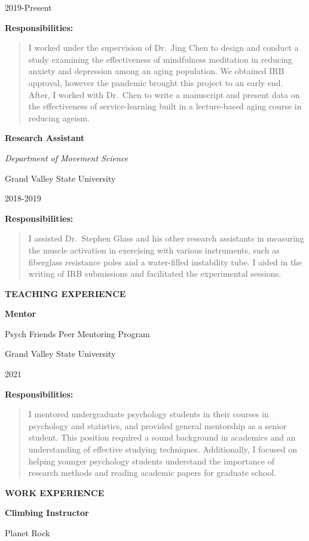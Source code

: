 \documentclass[10pt,a4paper,]{article}
\begin{document}
2019-Present

\textbf{Responsibilities:}

\begin{quote}
I worked under the supervision of Dr.~Jing Chen to design and conduct a
study examining the effectiveness of mindfulness meditation in reducing
anxiety and depression among an aging population. We obtained IRB
approval, however the pandemic brought this project to an early end.
After, I worked with Dr.~Chen to write a manuscript and present data on
the effectiveness of service-learning built in a lecture-based aging
course in reducing ageism.
\end{quote}

\textbf{Research Assistant}

\emph{Department of Movement Science}

Grand Valley State University

2018-2019

\textbf{Responsibilities:}

\begin{quote}
I assisted Dr.~Stephen Glass and his other research assistants in
measuring the muscle activation in exercising with various instruments,
such as fiberglass resistance poles and a water-filled instability tube.
I aided in the writing of IRB submissions and facilitated the
experimental sessions.
\end{quote}

\textbf{TEACHING EXPERIENCE}

\textbf{Mentor}

Psych Friends Peer Mentoring Program

Grand Valley State University

2021

\textbf{Responsibilities:}

\begin{quote}
I mentored undergraduate psychology students in their courses in
psychology and statistics, and provided general mentorship as a senior
student. This position required a sound background in academics and an
understanding of effective studying techniques. Additionally, I focused
on helping younger psychology students understand the importance of
research methods and reading academic papers for graduate school.
\end{quote}

\textbf{WORK EXPERIENCE}

\textbf{Climbing Instructor}

Planet Rock
\end{document}
